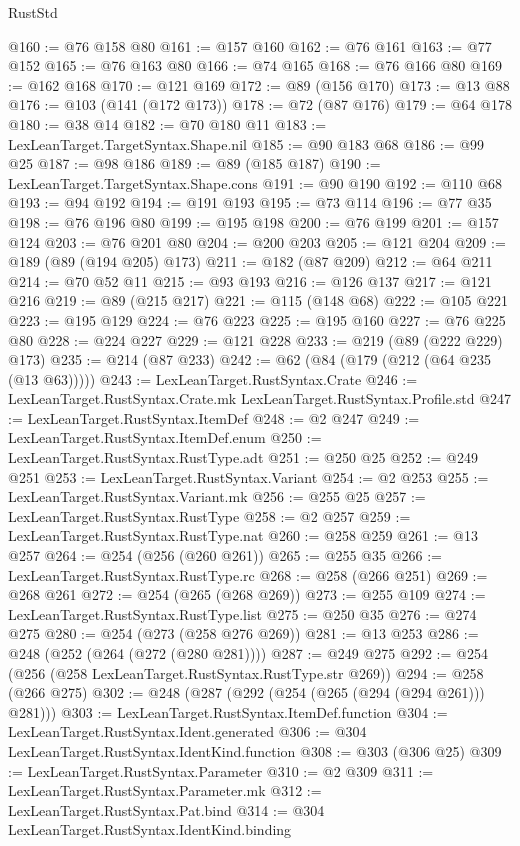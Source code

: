 \begin{lexlean}{RustStd}
\begin{coremodule}
@160 := @76 @158 @80
@161 := @157 @160
@162 := @76 @161
@163 := @77 @152
@165 := @76 @163 @80
@166 := @74 @165
@168 := @76 @166 @80
@169 := @162 @168
@170 := @121 @169
@172 := @89 (@156 @170)
@173 := @13 @88
@176 := @103 (@141 (@172 @173))
@178 := @72 (@87 @176)
@179 := @64 @178
@180 := @38 @14
@182 := @70 @180 @11
@183 := LexLeanTarget.TargetSyntax.Shape.nil
@185 := @90 @183 @68
@186 := @99 @25
@187 := @98 @186
@189 := @89 (@185 @187)
@190 := LexLeanTarget.TargetSyntax.Shape.cons
@191 := @90 @190
@192 := @110 @68
@193 := @94 @192
@194 := @191 @193
@195 := @73 @114
@196 := @77 @35
@198 := @76 @196 @80
@199 := @195 @198
@200 := @76 @199
@201 := @157 @124
@203 := @76 @201 @80
@204 := @200 @203
@205 := @121 @204
@209 := @189 (@89 (@194 @205) @173)
@211 := @182 (@87 @209)
@212 := @64 @211
@214 := @70 @52 @11
@215 := @93 @193
@216 := @126 @137
@217 := @121 @216
@219 := @89 (@215 @217)
@221 := @115 (@148 @68)
@222 := @105 @221
@223 := @195 @129
@224 := @76 @223
@225 := @195 @160
@227 := @76 @225 @80
@228 := @224 @227
@229 := @121 @228
@233 := @219 (@89 (@222 @229) @173)
@235 := @214 (@87 @233)
@242 := @62 (@84 (@179 (@212 (@64 @235 (@13 @63)))))
@243 := LexLeanTarget.RustSyntax.Crate
@246 := LexLeanTarget.RustSyntax.Crate.mk LexLeanTarget.RustSyntax.Profile.std
@247 := LexLeanTarget.RustSyntax.ItemDef
@248 := @2 @247
@249 := LexLeanTarget.RustSyntax.ItemDef.enum
@250 := LexLeanTarget.RustSyntax.RustType.adt
@251 := @250 @25
@252 := @249 @251
@253 := LexLeanTarget.RustSyntax.Variant
@254 := @2 @253
@255 := LexLeanTarget.RustSyntax.Variant.mk
@256 := @255 @25
@257 := LexLeanTarget.RustSyntax.RustType
@258 := @2 @257
@259 := LexLeanTarget.RustSyntax.RustType.nat
@260 := @258 @259
@261 := @13 @257
@264 := @254 (@256 (@260 @261))
@265 := @255 @35
@266 := LexLeanTarget.RustSyntax.RustType.rc
@268 := @258 (@266 @251)
@269 := @268 @261
@272 := @254 (@265 (@268 @269))
@273 := @255 @109
@274 := LexLeanTarget.RustSyntax.RustType.list
@275 := @250 @35
@276 := @274 @275
@280 := @254 (@273 (@258 @276 @269))
@281 := @13 @253
@286 := @248 (@252 (@264 (@272 (@280 @281))))
@287 := @249 @275
@292 := @254 (@256 (@258 LexLeanTarget.RustSyntax.RustType.str @269))
@294 := @258 (@266 @275)
@302 := @248 (@287 (@292 (@254 (@265 (@294 (@294 @261))) @281)))
@303 := LexLeanTarget.RustSyntax.ItemDef.function
@304 := LexLeanTarget.RustSyntax.Ident.generated
@306 := @304 LexLeanTarget.RustSyntax.IdentKind.function
@308 := @303 (@306 @25)
@309 := LexLeanTarget.RustSyntax.Parameter
@310 := @2 @309
@311 := LexLeanTarget.RustSyntax.Parameter.mk
@312 := LexLeanTarget.RustSyntax.Pat.bind
@314 := @304 LexLeanTarget.RustSyntax.IdentKind.binding

\end{coremodule}
\end{lexlean}
